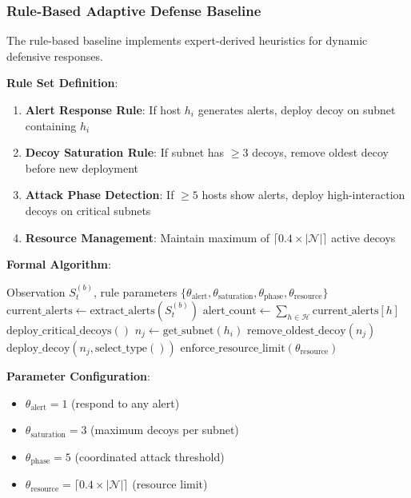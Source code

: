\documentclass[12pt]{article}
\newcounter{phase}[algorithm]
\theoremstyle{definition}
\theoremstyle{plain}
\begin{document}
\subsubsection{Rule-Based Adaptive Defense Baseline}

The rule-based baseline implements expert-derived heuristics for dynamic defensive responses.

\textbf{Rule Set Definition}:
\begin{enumerate}
    \item \textbf{Alert Response Rule}: If host $h_i$ generates alerts, deploy decoy on subnet containing $h_i$
    \item \textbf{Decoy Saturation Rule}: If subnet has $\geq 3$ decoys, remove oldest decoy before new deployment
    \item \textbf{Attack Phase Detection}: If $\geq 5$ hosts show alerts, deploy high-interaction decoys on critical subnets
    \item \textbf{Resource Management}: Maintain maximum of $\lceil 0.4 \times |\mathcal{N}| \rceil$ active decoys
\end{enumerate}

\textbf{Formal Algorithm}:
\begin{algorithm}[H]
\caption{Rule-Based Adaptive Defense}
\label{alg:rule_baseline}
\begin{algorithmic}[1]
\REQUIRE Observation $S_t^{(b)}$, rule parameters $\{\theta_{\text{alert}}, \theta_{\text{saturation}}, \theta_{\text{phase}}, \theta_{\text{resource}}\}$
\STATE $\text{current\_alerts} \leftarrow \text{extract\_alerts}(S_t^{(b)})$
\STATE $\text{alert\_count} \leftarrow \sum_{h \in \mathcal{H}} \text{current\_alerts}[h]$
    \STATE $\text{deploy\_critical\_decoys}()$ 
\ELSE
        \STATE $n_j \leftarrow \text{get\_subnet}(h_i)$
            \STATE $\text{remove\_oldest\_decoy}(n_j)$ 
        \ENDIF
        \STATE $\text{deploy\_decoy}(n_j, \text{select\_type}())$ 
    \ENDFOR
\ENDIF
\STATE $\text{enforce\_resource\_limit}(\theta_{\text{resource}})$ 
\end{algorithmic}
\end{algorithm}

\textbf{Parameter Configuration}:
\begin{itemize}
    \item $\theta_{\text{alert}} = 1$ (respond to any alert)
    \item $\theta_{\text{saturation}} = 3$ (maximum decoys per subnet)
    \item $\theta_{\text{phase}} = 5$ (coordinated attack threshold)  
    \item $\theta_{\text{resource}} = \lceil 0.4 \times |\mathcal{N}| \rceil$ (resource limit)
\end{itemize}
\end{document}
